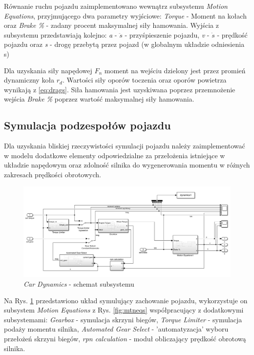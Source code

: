 \documentclass[12pt, a4paper, headings=normal]{article}
\begin{document}
Równanie ruchu pojazdu zaimplementowano wewnątrz subsystemu \textit{Motion Equations},
przyjmującego dwa parametry wyjściowe: \textit{Torque} - Moment na kołach oraz
\textit{Brake \%} - zadany procent maksymalnej siły hamowania. Wyjścia z subsystemu
przedstawiają kolejno: \textit{a} - $\ddot{s}$ - przyśpieszenie pojazdu, \textit{v} -
$\dot{s}$ - prędkość pojazdu oraz \textit{s} - drogę przebytą przez pojazd (w globalnym
układzie odniesienia s)

Dla uzyskania siły napędowej $F_n$ moment na wejściu dzielony jest przez promień dynamiczny
koła $r_d$. Wartości siły oporów toczenia oraz oporów powietrza wynikają z \eqref{eq:drags}. Siła
hamowania jest uzyskiwana poprzez przemnożenie wejścia \textit{Brake \%} poprzez wartość
maksymalnej siły hamowania.

\subsection{Symulacja podzespołów pojazdu}

Dla uzyskania bliskiej rzeczywistości symulacji pojazdu należy zaimplementować w 
modelu dodatkowe elementy odpowiedzialne za przełożenia istniejące w układzie napędowym
oraz zdolność silnika do wygenerowania momentu w różnych zakresach prędkości obrotowych.

\begin{figure}[H]
	\centering
	\includegraphics[width=\textwidth]{cardynamics.png}
	\caption{\textit{Car Dynamics} - schemat subsystemu}
	\label{fig:cardynamics}
\end{figure}

Na Rys. \ref{fig:cardynamics} przedstawiono układ symulujący zachowanie pojazdu,
wykorzystuje on subsystem \textit{Motion Equations} z Rys. \ref{fig:mtneqs} współpracujący z
dodatkowymi subsystemami: \textit{Gearbox} - symulacja skrzyni biegów, \textit{Torque Limiter} -
symulacja podaży momentu silnika, \textit{Automated Gear Select} - 'automatyzacja' 
wyboru przełożeń skrzyni biegów, \textit{rpn calculation} - moduł obliczający prędkość
obrotową silnika.
\end{document}
